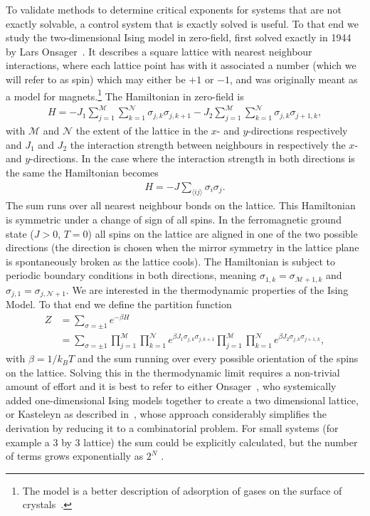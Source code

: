 \documentclass[11pt, a4paper]{report} %
\begin{document}
To validate methods to determine critical exponents for systems that are not exactly solvable, a control system that is exactly solved is useful. To that end we study the two-dimensional Ising model in zero-field, first solved exactly in 1944 by Lars Onsager~\cite{onsager:1944}.
It describes a square lattice with nearest neighbour interactions, where each lattice point has with it associated a number (which we will refer to as spin) which may either be \(+1\) or \(-1\), and was originally meant as a model for magnets.\footnote{The model is a better description of adsorption of gases on the surface of crystals~\cite{onsager:1944}.}
The Hamiltonian in zero-field is~\cite{mccoy:1973}
\begin{align}
	H = -J_{1} \sum_{j=1}^{\mathcal{M}} \sum_{k=1}^{\mathcal{N}} \sigma_{j,k} \sigma_{j,k+1} - J_{2} \sum_{j=1}^{\mathcal{M}} \sum_{k=1}^{\mathcal{N}} \sigma_{j,k} \sigma_{j+1,k},
\end{align}
with \(\mathcal{M}\) and \(\mathcal{N}\) the extent of the lattice in the \(x\)- and \(y\)-directions respectively and \(J_{1}\) and \(J_{2}\) the interaction strength between neighbours in respectively the \(x\)- and \(y\)-directions.
In the case where the interaction strength in both directions is the same the Hamiltonian becomes~\cite{newman:1999}
\begin{align}
	\label{eq:isotropic_Hamiltonian}
	H = -J \sum_{\langle ij \rangle} \sigma_{i} \sigma_{j}.
\end{align}
The sum runs over all nearest neighbour bonds on the lattice.
This Hamiltonian is symmetric under a change of sign of all spins.
In the ferromagnetic ground state (\(J>0\), \(T=0\)) all spins on the lattice are aligned in one of the two possible directions (the direction is chosen when the mirror symmetry in the lattice plane is spontaneously broken as the lattice cools).
The Hamiltonian is subject to periodic boundary conditions in both directions, meaning \(\sigma_{1,k} = \sigma_{\mathcal{M}+1,k}\) and \(\sigma_{j,1} = \sigma_{j,\mathcal{N}+1}\).
We are interested in the thermodynamic properties of the Ising Model.
To that end we define the partition function
\begin{align}
	Z &= \sum_{\sigma = \pm 1} e^{-\beta H} \\
	  &= \sum_{\sigma = \pm 1} \prod_{j=1}^{\mathcal{M}} \prod_{k=1}^{\mathcal{N}} e^{\beta J_1 \sigma_{j,k} \sigma_{j,k+1}} \prod_{j=1}^{\mathcal{M}} \prod_{k=1}^{\mathcal{N}} e^{\beta J_2 \sigma_{j,k} \sigma_{j+1,k}},
\end{align}
with \(\beta=1/k_B T\) and the sum running over every possible orientation of the spins on the lattice. Solving this in the thermodynamic limit requires a non-trivial amount of effort and it is best to refer to either Onsager~\cite{onsager:1944}, who systemically added one-dimensional Ising models together to create a two dimensional lattice, or Kasteleyn as described in~\cite{mccoy:1973}, whose approach considerably simplifies the derivation by reducing it to a combinatorial problem.
For small systems (for example a 3 by 3 lattice) the sum could be explicitly calculated, but the number of terms grows exponentially as \(2^N\) \cite{newman:1999,binney:1992}.
\end{document}
